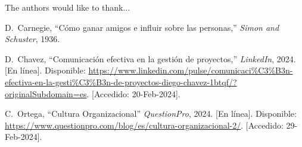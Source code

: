 \documentclass[journal]{IEEEtran}
\begin{document}
The authors would like to thank...

\begin{thebibliography}{1}
  
D.~Carnegie, ``Cómo ganar amigos e influir sobre las personas,'' \emph{Simon and Schuster}, 1936.
  
D.~Chavez, ``Comunicación efectiva en la gestión de proyectos,'' \emph{LinkedIn}, 2024. [En línea]. Disponible: \url{https://www.linkedin.com/pulse/comunicaci%C3%B3n-efectiva-en-la-gesti%C3%B3n-de-proyectos-diego-chavez-1btqf/?originalSubdomain=es}. [Accedido: 20-Feb-2024].

C.~Ortega,  ``Cultura Organizacional'' \emph{QuestionPro}, 2024. [En línea]. Disponible: \url{https://www.questionpro.com/blog/es/cultura-organizacional-2/}. [Accedido: 29-Feb-2024].

\end{thebibliography}
\end{document}
